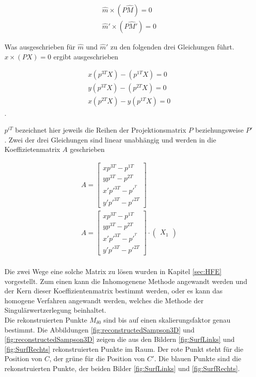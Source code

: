 \begin{gather}
	\hat{m} \times (P\hat{M}) = 0\\
	\hat{m}' \times (P\hat{M}') = 0
\end{gather}

Was ausgeschrieben für $\hat{m}$ und $\hat{m}'$ zu den folgenden drei Gleichungen führt. $x \times (PX) = 0$ ergibt ausgeschrieben

\begin{gather}
x(p^{3T}X) - (p^{1T}X)=0\\
y(p^{3T}X) - (p^{2T}X)=0\\
x(p^{2T}X) - y(p^{1T}X)=0
\end{gather}
.

$p^{iT}$ bezeichnet hier jeweils die Reihen der Projektionsmatrix $P$ beziehungsweise $P'$. Zwei der drei Gleichungen sind linear unabhängig und werden in die Koeffizietenmatrix $A$ geschrieben 



\begin{gather}
A = \begin{bmatrix}
xp^{3T}-p^{1T}\\
yp^{3T}-p^{2T}\\
x'p'^{3T}-p'^{^T}\\
y'p'^{3T}-p'^{2T}
\end{bmatrix}\\
A = \begin{bmatrix}
	xp^{3T}-p^{1T}\\
	yp^{3T}-p^{2T}\\
	x'p'^{3T}-p'^{^T}\\
	y'p'^{3T}-p'^{2T}
\end{bmatrix} \cdot
\begin{pmatrix}
	X_1
\end{pmatrix}
\end{gather}\\

Die zwei Wege eine solche Matrix zu lösen wurden in Kapitel \ref{sec:HFE} vorgestellt. Zum einen kann die Inhomogenene Methode angewandt werden und der Kern dieser Koeffizientenmatrix bestimmt werden, oder es kann das homogene Verfahren angewandt werden, welches die Methode der Singulärwertzerlegung beinhaltet. \\

Die rekonstruierten Punkte $M_{\delta 0}$ sind bis auf einen skalierungsfaktor genau bestimmt.
Die Abbildungen \ref{fig:reconstructedSampson3D} und \ref{fig:reconstructedSampson3D} zeigen die aus den Bildern \ref{fig:SurfLinks} und \ref{fig:SurfRechts} rekonstruierten Punkte im Raum. Der rote Punkt steht für die Position von $C$, der grüne für die Position von $C'$. Die blauen Punkte sind die rekonstruierten Punkte, der beiden Bilder \ref{fig:SurfLinks} und \ref{fig:SurfRechts}. 

